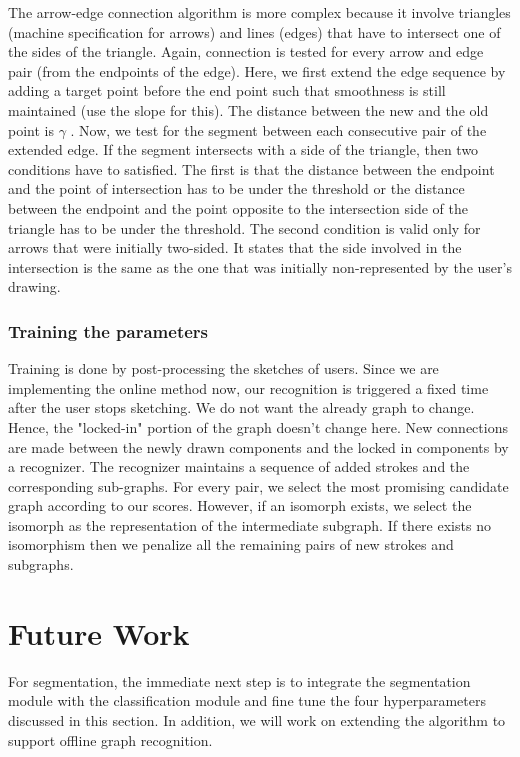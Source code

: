 The arrow-edge connection algorithm is more complex because it involve triangles (machine specification for arrows) and lines (edges) that have to intersect one of the sides of the triangle. Again, connection is tested for every arrow and edge pair (from the endpoints of the edge). Here, we first extend the edge sequence by adding a target point before the end point such that smoothness is still maintained (use the slope for this). The distance between the new and the old point is $\gamma$ . Now, we test for the segment between each consecutive pair of the extended edge. If the segment intersects with a side of the triangle, then two conditions have to satisfied. The first is that the distance between the endpoint and the point of intersection has to be under the threshold or the distance between the endpoint and the point opposite to the intersection side of the triangle has to be under the threshold. The second condition is valid only for arrows that were initially two-sided. It states that the side involved in the intersection is the same as the one that was initially non-represented by the user's drawing.\\

\subsubsection{Training the parameters}

Training is done by post-processing the sketches of users. Since we are implementing the online method now, our recognition is triggered a fixed time after the user stops sketching. We do not want the already graph to change. Hence, the "locked-in" portion of the graph doesn't change here. New connections are made between the newly drawn components and the locked in components by a recognizer. The recognizer maintains a sequence of added strokes and the corresponding sub-graphs. For every pair, we select the most promising candidate graph according to our scores. However, if an isomorph exists, we select the isomorph as the representation of the intermediate subgraph. If there exists no isomorphism then we penalize all the remaining pairs of new strokes and subgraphs.\\

\section{Future Work}
For segmentation, the immediate next step is to integrate the segmentation module with the classification module and fine tune the four hyperparameters discussed in this section. In addition, we will work on extending the algorithm to support offline graph recognition.\\


